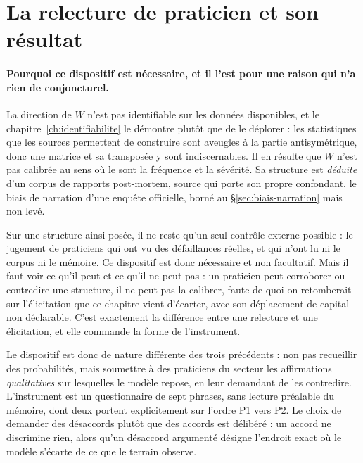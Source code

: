
\section{La relecture de praticien et son résultat}
\label{sec:relecture-praticien}

\paragraph{Pourquoi ce dispositif est nécessaire, et il l'est pour une raison qui n'a rien de
conjoncturel.} La direction de $W$ n'est pas identifiable sur les données disponibles,
et le chapitre~\ref{ch:identifiabilite} le démontre plutôt que de le déplorer : les statistiques
que les sources permettent de construire sont aveugles à la partie antisymétrique, donc une
matrice et sa transposée y sont indiscernables. Il en résulte que $W$ n'est pas calibrée au sens où le sont la fréquence et
la sévérité. Sa structure est \emph{déduite} d'un corpus de rapports post-mortem, source qui
porte son propre confondant, le biais de narration d'une enquête officielle, borné au
\S\ref{sec:biais-narration} mais non levé.

Sur une structure ainsi posée, il ne reste qu'un seul contrôle externe possible : le
jugement de praticiens qui ont vu des défaillances réelles, et qui n'ont lu ni le corpus ni le
mémoire. Ce dispositif est donc nécessaire et non facultatif. Mais il faut voir ce
qu'il peut et ce qu'il ne peut pas : un praticien peut corroborer ou contredire une
structure, il ne peut pas la calibrer, faute de quoi on retomberait sur l'élicitation
que ce chapitre vient d'écarter, avec son déplacement de capital non déclarable. C'est
exactement la différence entre une relecture et une élicitation, et elle commande la forme de
l'instrument.

Le dispositif est donc de nature différente des trois précédents : non pas recueillir des
probabilités, mais soumettre à des praticiens du secteur les affirmations \emph{qualitatives}
sur lesquelles le modèle repose, en leur demandant de les contredire. L'instrument est
un questionnaire de sept phrases, sans lecture préalable du mémoire, dont deux portent
explicitement sur l'ordre P1 vers P2. Le choix de demander des désaccords plutôt que des
accords est délibéré : un accord ne discrimine rien, alors qu'un désaccord argumenté désigne
l'endroit exact où le modèle s'écarte de ce que le terrain observe.

